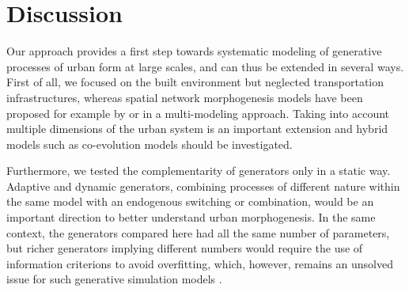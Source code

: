 \documentclass[letterpaper]{article}
\begin{document}



\section{Discussion} \label{sec:discussion}


Our approach provides a first step towards systematic modeling of generative processes of urban form at large scales, and can thus be extended in several ways.
First of all, we focused on the built environment but neglected transportation infrastructures, whereas spatial network morphogenesis models have been proposed for example by \cite{courtat2011mathematics} or \cite{raimbault2018multi} in a multi-modeling approach.
Taking into account multiple dimensions of the urban system is an important extension and hybrid models such as co-evolution models \citep{raimbault2014hybrid} should be investigated.

Furthermore, we tested the complementarity of generators only in a static way. Adaptive and dynamic generators, combining processes of different nature within the same model with an endogenous switching or combination, would be an important direction to better understand urban morphogenesis.
In the same context, the generators compared here had all the same number of parameters, but richer generators implying different numbers would require the use of information criterions to avoid overfitting, which, however, remains an unsolved issue for such generative simulation models \citep{piou2009proposing}.
\end{document}
